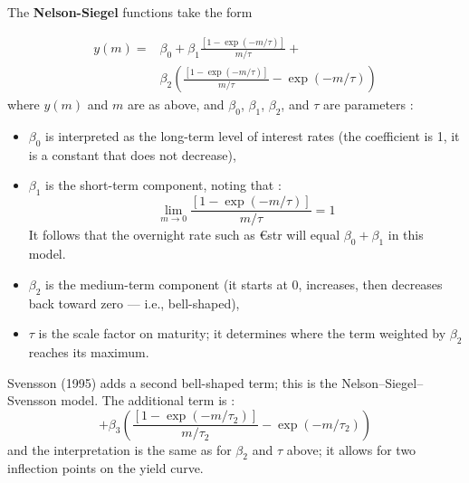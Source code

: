 \begin{f}


The \textbf{Nelson-Siegel} functions take the form

{\small\begin{align*}
y( m ) =& \beta _0 + \beta _1\frac{{\left[ {1 - \exp \left( { - m/\tau} \right)} \right]}}{m/\tau} + \\
		&\beta _2 {\left(\frac{{\left[ {1 - \exp \left( { - m/\tau} \right)} \right]}}{m/\tau} - \exp \left( { - m/\tau}\right)\right)}
\label{MTNSeq}
\end{align*}}
%
where \(y\left( m \right)\) and \(m\) are as above, and \(\beta_0\), \(\beta_1\), \(\beta_2\), and \(\tau\) are parameters :


\begin{itemize}

\item   \(\beta_0\) is interpreted as the long-term level of interest rates (the coefficient is 1, it is a constant that does not decrease),

\item   \(\beta_1\) is the short-term component, noting that :
\begin{equation*}
	\lim_{m \rightarrow 0} \frac{{\left[ {1 - \exp \left( { - m/\tau} \right)} \right]}}{m/\tau}=1
\end{equation*}
It follows that the overnight rate such as €str will equal \(\beta_0 + \beta_1\) in this model.
\item \(\beta_2\) is the medium-term component (it starts at 0, increases, then decreases back toward zero — i.e., bell-shaped),
\item \(\tau\) is the scale factor on maturity; it determines where the term weighted by \(\beta_2\) reaches its maximum.
\end{itemize}

Svensson (1995) adds a second bell-shaped term; this is the Nelson–Siegel–Svensson model. The additional term is :
%
\begin{equation*}
+\beta _3 {\left(\frac{{\left[ {1 - \exp \left( { - m/\tau_2} \right)} \right]}}{m/\tau_2} - \exp \left( { - m/\tau_2}\right)\right)}
\label{MTSveq}
\end{equation*}
and the interpretation is the same as for \(\beta_2\) and \(\tau\) above; it allows for two inflection points on the yield curve.


\end{f}
